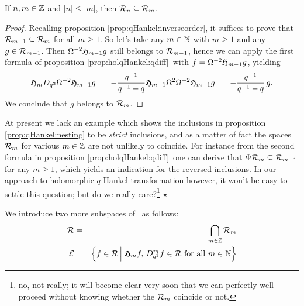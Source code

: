 \begin{prop} \label{prop:qHankel:nesting}
If $n,m\in \mathbb{Z}$ and $|n| \leq |m|$, then ${\mathcal R}_{n} \subseteq {\mathcal R}_{m}$.
\end{prop}
\begin{proof}
Recalling proposition \ref{prop:qHankel:inverseorder},
it suffices to prove that ${\mathcal R}_{m-1} \subseteq {\mathcal R}_{m}$ for all $m\geq 1$.
So let's take any $m\in \mathbb{N}$ with $m\geq 1$ and any $g\in {\mathcal R}_{m-1}$.
Then $\Omega^{-2} \mathfrak{H}_{m-1}g$ still belongs to ${\mathcal R}_{m-1}$,
hence we can apply the first formula of proposition \ref{prop:holqHankel:qdiff}\
with $f=\Omega^{-2} \mathfrak{H}_{m-1}g$, yielding
\begin{equation}\label{eq:qHankel:nesting:proof}
     \mathfrak{H}_{m} D_{q^2} \Omega^{-2} \mathfrak{H}_{m-1} g
      \;=\: -\frac{q^{-1}}{q^{-1}-q} \mathfrak{H}_{m-1} \Omega^2 \Omega^{-2} \mathfrak{H}_{m-1}g
      \;=\: -\frac{q^{-1}}{q^{-1}-q} \, g.
\end{equation}
We conclude that $g$ belongs to ${\mathcal R}_{m}$.
\end{proof}



\begin{remark} \label{rem:Q:strict_inclusions} \rm
At present we lack an example which shows the inclusions in
proposition \ref{prop:qHankel:nesting} to be {\em strict\/} inclusions,
and as a matter of fact the spaces ${\mathcal R}_{m}$ for various $m\in\mathbb{Z}$ are not unlikely
to coincide. For instance from the second formula in proposition
\ref{prop:holqHankel:qdiff}\ one can derive that
$\Psi {\mathcal R}_{m} \subseteq {\mathcal R}_{m-1}$ for any $m\geq 1$, which yields an indication
for the reversed inclusions. In our approach to holomorphic $q$-Hankel transformation
however, it won't be easy to settle this question; but do we really
care?\footnote{no, not really; it will become clear very soon that we can perfectly
well proceed without knowing whether the ${\mathcal R}_{m}$ coincide or not. }
$\hfill \star$
\end{remark}



\begin{defn*} \label{def:Hcore}
We introduce two more subspaces of \HC\ as follows:
\begin{eqnarray*}
  \Hintersect &=& \bigcap_{m\in\ZZ} \holS{m}  \\
  \Hcore      &=& \left\{ f \in \Hintersect \left| \vertL \right.
                  \holH{m}f, \, D_{q^2}^m f \in \Hintersect
                  \mbox{ for all } m\in \NN  \right\} \\
\end{eqnarray*}
\end{defn*}

